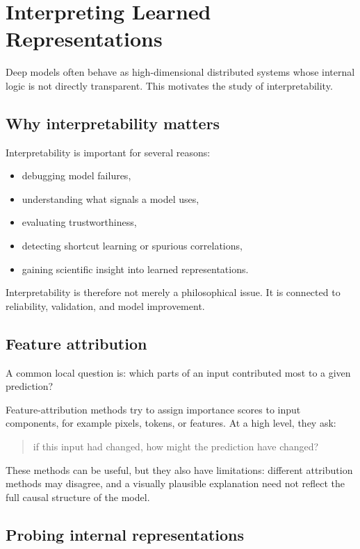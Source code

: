 \section{Interpreting Learned Representations}

Deep models often behave as high-dimensional distributed systems whose internal logic is not directly transparent.
This motivates the study of interpretability.

\subsection*{Why interpretability matters}

Interpretability is important for several reasons:
\begin{itemize}
    \item debugging model failures,
    \item understanding what signals a model uses,
    \item evaluating trustworthiness,
    \item detecting shortcut learning or spurious correlations,
    \item gaining scientific insight into learned representations.
\end{itemize}

Interpretability is therefore not merely a philosophical issue.
It is connected to reliability, validation, and model improvement.

\subsection*{Feature attribution}

A common local question is:
which parts of an input contributed most to a given prediction?

\medskip

Feature-attribution methods try to assign importance scores to input components, for example pixels, tokens, or features.
At a high level, they ask:
\begin{quote}
if this input had changed, how might the prediction have changed?
\end{quote}

These methods can be useful, but they also have limitations:
different attribution methods may disagree, and a visually plausible explanation need not reflect the full causal structure of the model.

\subsection*{Probing internal representations}

